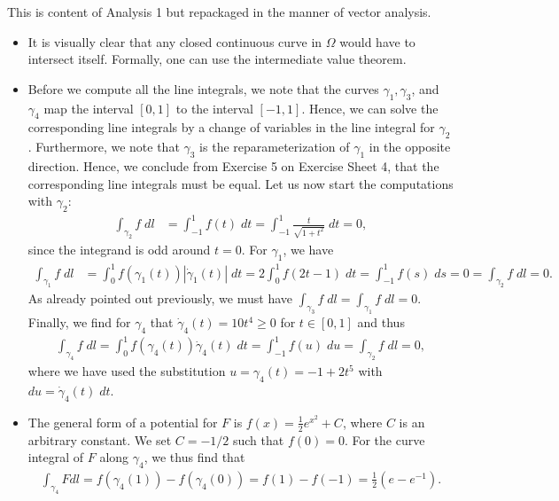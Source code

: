 \documentclass[11pt]{article}
\begin{document}
\begin{solution}
    This is content of Analysis 1 but repackaged in the manner of vector analysis. 
    \begin{itemize}
        \item It is visually clear that any closed continuous curve in $\Omega$ would have to intersect itself.
		Formally, one can use the intermediate value theorem.
        \item Before we compute all the line integrals, we note that the curves $\gamma_1, \gamma_3$, and $\gamma_4$ map the interval $[0, 1]$ to the interval $[-1, 1]$.
        Hence, we can solve the corresponding line integrals by a change of variables in the line integral for $\gamma_2$.
        Furthermore, we note that $\gamma_3$ is the reparameterization of $\gamma_1$ in the opposite direction. Hence, we conclude from Exercise 5 on Exercise Sheet 4,
        that the corresponding line integrals must be equal. Let us now start the computations with $\gamma_2$:
        \begin{align}
            \int_{\gamma_2} f \;dl 
            &= 
            \int_{-1}^1 f(t) \;dt 
            = 
            \int_{-1}^1 \frac{t}{\sqrt{1+t^2}} \;dt 
            = 0,
        \end{align}
        since the integrand is odd around $t = 0$. For $\gamma_1$, we have
        \begin{align}
            \int_{\gamma_1} f \;dl 
            &= 
            \int_{0}^1 f(\gamma_1(t)) |\dot \gamma_1(t)| \;dt 
            = 
            2\int_{0}^1 f(2t - 1) \;dt 
            = \int_{-1}^1 f(s) \;ds = 0 = \int_{\gamma_2} f \;dl = 0.
        \end{align}
        As already pointed out previously, we must have $\int_{\gamma_3} f \;dl = \int_{\gamma_1} f \;dl = 0$. 
        Finally, we find for $\gamma_4$ that $\dot \gamma_4(t) = 10t^4 \geq 0$ for $t \in [0,1]$
        and thus
        \begin{align}
            \int_{\gamma_4} f \;dl 
            = 
            \int_{0}^1 f(\gamma_4(t)) \dot \gamma_4(t) \;dt 
            = 
            \int_{-1}^1 f(u) \;du = \int_{\gamma_2} f \;dl = 0,
        \end{align}
        where we have used the substitution $u = \gamma_4(t) = -1 + 2t^5$ with $du = \dot \gamma_4(t) \;dt$.
        \item The general form of a potential for $F$ is $f(x) = \frac 1 2 e^{x^2} + C$, where $C$ is an arbitrary constant. We set
        $C = -1/2$ such that $f(0) = 0$. For the curve integral of $F$ along $\gamma_4$, we thus find that
        \begin{align}
            \int_{\gamma_4} F dl = f(\gamma_4(1)) - f(\gamma_4(0)) = f(1) - f(-1) = \frac 1 2 (e - e^{-1}).
        \end{align}
    \end{itemize}
\end{solution}
\end{document}
